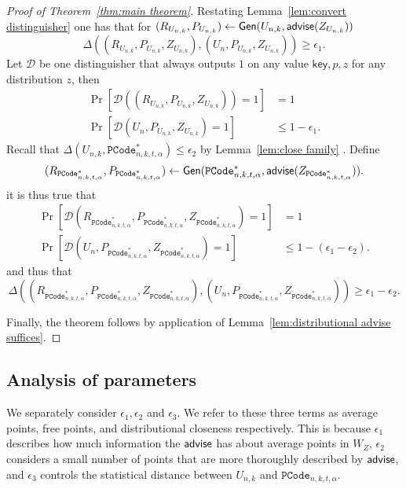 \begin{proof}[Proof of Theorem~\ref{thm:main theorem}]
Restating Lemma~\ref{lem:convert distinguisher} one has that for $(R_{U_{n,k}},P_{U_{n,k}}) \leftarrow {\ensuremath{\mathsf{Gen}}}(U_{n,k}, {\mathsf{advise}}(Z_{U_{n,k}}))$
\[
\Delta((R_{U_{n,k}}, P_{U_{n,k}}, Z_{U_{n,k}}), (U_n, P_{U_{n,k}}, Z_{U_{n,k}}))\ge \epsilon_1.
\]
Let $\mathcal{D}$ be one distinguisher that always outputs $1$ on any value $\mathsf{key}, p, z$ for any distribution $z$, then
\begin{align*}
\Pr[\mathcal{D}((R_{U_{n,k}}, P_{U_{n,k}}, Z_{U_{n,k}}))=1] &=1\\
\Pr[\mathcal{D}(U_n, P_{U_{n,k}}, Z_{U_{n,k}})=1]&\le 1-\epsilon_1.
\end{align*}
Recall that $\Delta(U_{n,k}, \mathtt{PCode}_{n, k, t, \alpha}^{*}) \le \epsilon_2$ by Lemma~\ref{lem:close family} .  Define \[(R_{\mathtt{PCode}_{n, k, t, \alpha}^{*}}, P_{\mathtt{PCode}_{n, k, t, \alpha}^{*}})\leftarrow {\ensuremath{\mathsf{Gen}}}(\mathtt{PCode}_{n, k, t, \alpha}^{*}, {\mathsf{advise}}(Z_{\mathtt{PCode}_{n, k, t, \alpha}^{*}})).\]
it is thus true that 
\begin{align*}
\Pr[\mathcal{D}(R_{\mathtt{PCode}_{n, k, t, \alpha}^{*}}, P_{\mathtt{PCode}_{n, k, t, \alpha}^{*}}, Z_{\mathtt{PCode}_{n, k, t, \alpha}^{*}})=1]&=1\\
\Pr[\mathcal{D}(U_n, P_{\mathtt{PCode}_{n, k, t, \alpha}^{*}}, Z_{\mathtt{PCode}_{n, k, t, \alpha}^{*}})=1]&\le 1-(\epsilon_1-\epsilon_2).
\end{align*}
and thus that 
\[
\Delta((R_{\mathtt{PCode}_{n, k, t, \alpha}^{*}}, P_{\mathtt{PCode}_{n, k, t, \alpha}^{*}}, Z_{\mathtt{PCode}_{n, k, t, \alpha}^{*}}), (U_n, P_{\mathtt{PCode}_{n, k, t, \alpha}^{*}}, Z_{\mathtt{PCode}_{n, k, t, \alpha}^{*}}))\ge \epsilon_1-\epsilon_2.
\]

\noindent
Finally, the theorem follows by application of Lemma~\ref{lem:distributional advise suffices}.
\end{proof} 

\subsection{Analysis of parameters}
We separately consider $\epsilon_1, \epsilon_2$ and $\epsilon_3$. We refer to these three terms as average points, free points, and distributional closeness respectively. This is because $\epsilon_1$ describes how much information the ${\mathsf{advise}}$ has about average points in $W_Z$, $\epsilon_2$ considers a small number of points that are more thoroughly described by ${\mathsf{advise}}$, and $\epsilon_3$ controls the statistical distance between $U_{n, k}$ and $\mathtt{PCode}_{n, k, t, \alpha}$.




